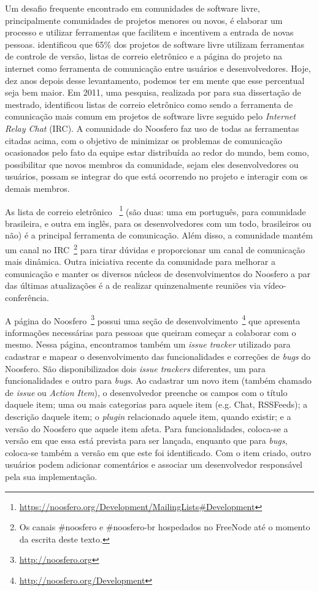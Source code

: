 Um desafio frequente encontrado em comunidades de software livre, principalmente
comunidades de projetos menores ou novos, é elaborar um processo e utilizar
ferramentas que facilitem e incentivem a entrada de novas pessoas.
 identificou que 65\% dos projetos de software livre
utilizam ferramentas de controle de versão, listas de correio eletrônico e a
página do projeto na internet como ferramenta de comunicação entre usuários e
desenvolvedores. Hoje, dez anos depois desse levantamento, podemos ter em mente
que esse percentual seja bem maior.
%
Em 2011, uma pesquisa, realizada por 
para sua dissertação de mestrado, identificou listas de correio eletrônico como
sendo a ferramenta de comunicação mais comum em projetos de software livre
seguido pelo \textit{Internet Relay Chat} (IRC).
%
A comunidade do Noosfero faz uso de todas as ferramentas citadas acima, com
o objetivo de minimizar os problemas de comunicação ocasionados pelo fato da
equipe estar distribuída ao redor do mundo, bem como, possibilitar que novos
membros da comunidade, sejam eles desenvolvedores ou usuários, possam se
integrar do que está ocorrendo no projeto e interagir com os demais membros.

As lista de correio eletrônico
~\footnote{\url{https://noosfero.org/Development/MailingLists\#Development}}
(são duas: uma em português, para comunidade brasileira, e outra em inglês,
para os desenvolvedores com um todo, brasileiros ou não) é a principal
ferramenta de comunicação.
%
Além disso, a comunidade mantém um canal no IRC~\footnote{Os canais \#noosfero e
\#noosfero-br hospedados no FreeNode até o momento da escrita deste texto.}
para tirar dúvidas e proporcionar um canal de comunicação mais dinâmica.
%
Outra iniciativa recente da comunidade para melhorar a comunicação e manter os
diversos núcleos de desenvolvimentos do Noosfero a par das últimas atualizações
é a de realizar quinzenalmente reuniões via vídeo-conferência.

A página do Noosfero~\footnote{\url{http://noosfero.org}} possui uma seção de
desenvolvimento~\footnote{\url{http://noosfero.org/Development}} que apresenta
informações necessárias para pessoas que queiram começar a colaborar com o
mesmo. Nessa página, encontramos também um \textit{issue tracker} utilizado para
cadastrar e mapear o desenvolvimento das funcionalidades e correções de
\textit{bugs} do Noosfero.
%
São disponibilizados dois \textit{issue trackers} diferentes, um para
funcionalidades e outro para \textit{bugs}. Ao cadastrar um novo item
(também chamado de \textit{issue} ou \textit{Action Item}), o
desenvolvedor preenche os campos com o título daquele item; uma ou mais
categorias para aquele item (e.g. Chat, RSSFeeds); a descrição daquele
item; o \textit{plugin} relacionado aquele item, quando existir; e a
versão do Noosfero que aquele item afeta.
%
Para funcionalidades, coloca-se a
versão em que essa está prevista para ser lançada, enquanto que para
\textit{bugs}, coloca-se também a versão em que este foi identificado. Com o
item criado, outro usuários podem adicionar comentários e associar um
desenvolvedor responsável pela sua implementação.

